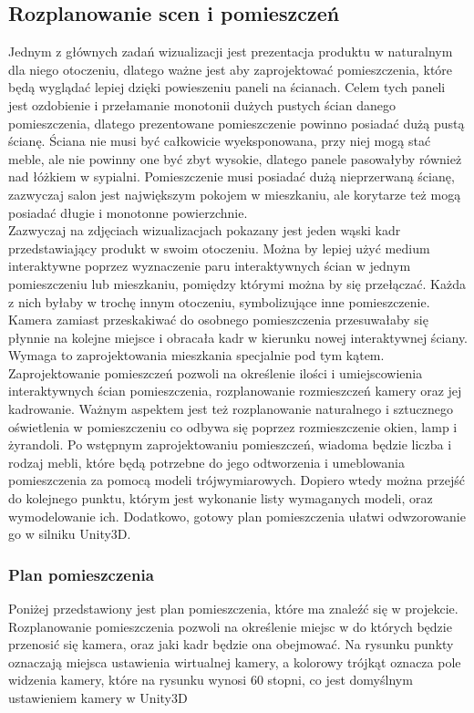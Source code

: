 \documentclass{article} %
\begin{document}
    \subsection{Rozplanowanie scen i pomieszczeń}
        Jednym z głównych zadań wizualizacji jest prezentacja produktu w naturalnym dla niego otoczeniu, dlatego ważne jest aby zaprojektować pomieszczenia, które będą wyglądać lepiej dzięki powieszeniu paneli na ścianach. Celem tych paneli jest ozdobienie i przełamanie monotonii dużych pustych ścian danego pomieszczenia, dlatego prezentowane pomieszczenie powinno posiadać dużą pustą ścianę. Ściana nie musi być całkowicie wyeksponowana, przy niej mogą stać meble, ale nie powinny one być zbyt wysokie, dlatego panele pasowałyby również nad łóżkiem w sypialni. Pomieszczenie musi posiadać dużą nieprzerwaną ścianę, zazwyczaj salon jest największym pokojem w mieszkaniu, ale korytarze też mogą posiadać długie i monotonne powierzchnie.
        \\
        
        Zazwyczaj na zdjęciach wizualizacjach pokazany jest jeden wąski kadr przedstawiający produkt w swoim otoczeniu. Można by lepiej użyć medium interaktywne poprzez wyznaczenie paru interaktywnych ścian w jednym pomieszczeniu lub mieszkaniu, pomiędzy którymi można by się przełączać. Każda z nich byłaby w trochę innym otoczeniu, symbolizujące inne pomieszczenie. Kamera zamiast przeskakiwać do osobnego pomieszczenia przesuwałaby się płynnie na kolejne miejsce i obracała kadr w kierunku nowej interaktywnej ściany. Wymaga to zaprojektowania mieszkania specjalnie pod tym kątem.
        \\
        
        Zaprojektowanie pomieszczeń pozwoli na określenie ilości i umiejscowienia interaktywnych ścian pomieszczenia, rozplanowanie rozmieszczeń kamery oraz jej kadrowanie. Ważnym aspektem jest też rozplanowanie naturalnego i sztucznego oświetlenia w pomieszczeniu co odbywa się poprzez rozmieszczenie okien, lamp i żyrandoli. Po wstępnym zaprojektowaniu pomieszczeń, wiadoma będzie liczba i rodzaj mebli, które będą potrzebne do jego odtworzenia i umeblowania pomieszczenia za pomocą modeli trójwymiarowych. Dopiero wtedy można przejść do kolejnego punktu, którym jest wykonanie listy wymaganych modeli, oraz wymodelowanie ich. Dodatkowo, gotowy plan pomieszczenia ułatwi odwzorowanie go w silniku Unity3D.
        \\
        
        \subsubsection{Plan pomieszczenia}
        Poniżej przedstawiony jest plan pomieszczenia, które ma znaleźć się w projekcie. Rozplanowanie pomieszczenia pozwoli na określenie miejsc w do których będzie przenosić się kamera, oraz jaki kadr będzie ona obejmować. Na rysunku punkty oznaczają miejsca ustawienia wirtualnej kamery, a kolorowy trójkąt oznacza pole widzenia kamery, które na rysunku wynosi 60 stopni, co jest domyślnym ustawieniem kamery w Unity3D
        \\
        
\end{document}
